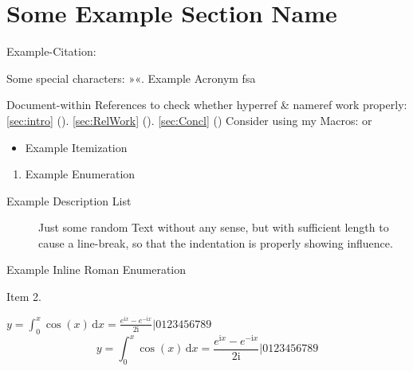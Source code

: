 



\section{Some Example Section Name}

Example-Citation:
\cite{DenKr_denkrement1_indeco}

\npi%
Some special characters:
»«.
\nl%
\nl%
Example Acronym\nl
\gls{fsa}

\npi%
Document-within References to check whether hyperref \& nameref work properly:\nl%
\ref{sec:intro} (). \ref{sec:RelWork}  (). \ref{sec:Concl} ()\nl%
Consider using my Macros:\nl
{} or 

\npi%
\begin{itemize}
\item%
    Example Itemization
\end{itemize}
\begin{enumerate}
\item%
    Example Enumeration
\end{enumerate}
\begin{description}
\item[Example Description List]%
    Just some random Text without any sense, but with sufficient length to cause a line-break, so that the indentation is properly showing influence.
\end{description}
\begin{enuminlrom}
\item%
    Example Inline Roman Enumeration
\item%
    Item 2.
\end{enuminlrom}

\np
\newcommand{\I}{\mathrm{i}}
$y = \int_0^x\cos(x)\,\mathrm{d}{x} = \frac{e^{\I x} - e^{-\I x}}{2\I} | 0123456789$
\nl
\begin{equation}
y = \int_0^x\cos(x)\,\mathrm{d}{x} = \frac{e^{\I x} - e^{-\I x}}{2\I} | 0123456789
\end{equation}

\npi%
{%
    \LARGE%
    \contourlength{\DenKrOutlineWidth}%
    \nl%
    {%
        \contourlength{0.2em}%
        \nl%
        \nl%
    }%
    \nl%
}%



